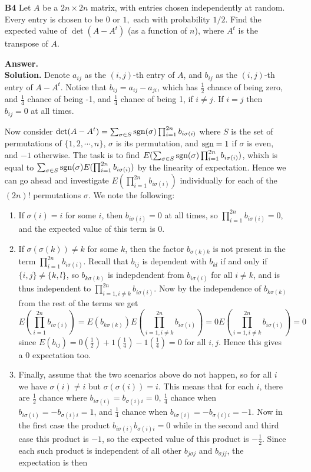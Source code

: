 \documentclass[11pt,a4paper]{article}
\newcommand{\<}{\langle}
\renewcommand{\>}{\rangle}
\begin{document}
\begin{enumerate}
	\item[\textbf{B4}]Let $A$ be a $2n\times 2n$ matrix, with entries chosen independently at random. Every entry is chosen to be $0$ or $1,$ each with probability $1/2.$ Find the expected value of $\det(A-A^t)$ (as a function of $n$), where $A^t$ is the transpose of $A.$
	
	\textbf{Answer.}\\
	\textbf{Solution.} Denote $a_{ij}$ as the $(i, j)$-th entry of $A$, and $b_{ij}$ as the $(i, j)$-th entry of $A-A^t$. Notice that $b_{ij}=a_{ij}-a_{ji}$, which has $\frac 12$ chance of being zero, and $\frac 14$ chance of being -1, and $\frac 14$ chance of being 1, if $i\neq j$. If $i=j$ then $b_{ij}=0$ at all times. 
	
	Now consider $\det(A-A^t)=\sum_{\sigma\in S}\text{sgn}(\sigma)\prod_{i=1}^{2n}b_{i\sigma(i)}$ where $S$ is the set of permutations of $\{1, 2, \cdots , n\}$, $\sigma$ is its permutation, and $\text{sgn}=1$ if $\sigma$ is even, and $-1$ otherwise. The task is to find $E(\sum_{\sigma\in S}\text{sgn}(\sigma)\prod_{i=1}^{2n}b_{i\sigma(i)})$, whixh is equal to $\sum_{\sigma\in S}\text{sgn}(\sigma)E(\prod_{i=1}^{2n}b_{i\sigma(i)})$ by the linearity of expectation. Hence we can go ahead and investigate $E(\prod_{i=1}^{2n}b_{i\sigma(i)})$ individually for each of the $(2n)!$ permutations $\sigma$. We note the following: 
	\begin{enumerate}
		\item If $\sigma(i)=i$ for some $i$, then $b_{i\sigma(i)}=0$ at all times, so $\prod_{i=1}^{2n}b_{i\sigma(i)}=0$, and the expected value of this term is 0. 
		\item If $\sigma(\sigma(k))\neq k$ for some $k$, then the factor $b_{\sigma(k)k}$ is not present in the term $\prod_{i=1}^{2n}b_{i\sigma(i)}$. Recall that $b_{ij}$ is dependent with $b_{kl}$ if and only if $\{i, j\}\neq \{k, l\}$, so $b_{k\sigma(k)}$ is indepdendent from $b_{i\sigma(i)}$ for all $i\neq k$, and is thus independent to $\prod_{i=1, i\neq k}^{2n}b_{i\sigma(i)}$. 
		Now by the independence of $b_{k\sigma(k)}$ from the rest of the terms we get 
		\[E(\prod_{i=1}^{2n}b_{i\sigma(i)})=E(b_{k\sigma(k)})E(\prod_{i=1, i\neq k}^{2n}b_{i\sigma(i)})
		=0E(\prod_{i=1, i\neq k}^{2n}b_{i\sigma(i)})=0\]
		since $E(b_{ij})=0(\frac 12)+1(\frac 14)-1(\frac 14)=0$ for all $i, j$. Hence this gives a 0 expectation too. 
		\item Finally, assume that the two scenarios above do not happen, so for all $i$ we have $\sigma(i)\neq i$ but $\sigma(\sigma(i))=i$. This means that for each $i$, there are $\frac 12$ chance where $b_{i\sigma(i)}=b_{\sigma(i)i}=0$, $\frac 14$ chance when $b_{i\sigma(i)}=-b_{\sigma(i)i}=1$, and $\frac 14$ chance when $b_{i\sigma(i)}=-b_{\sigma(i){i}}=-1$. Now in the first case the product $b_{i\sigma(i)}b_{\sigma(i)i}=0$ while in the second and third case this product is $-1$, so the expected value of this product is $-\frac 12$. Since each such product is independent of all other $b_{j\sigma{j}}$ and $b_{\sigma{j}j}$, the expectation is then 

\end{enumerate}
\end{enumerate}
\end{document}
